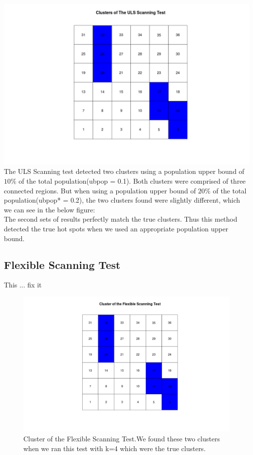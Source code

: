 \documentclass[12pt]{article}
\begin{document}
	 \includegraphics[scale=0.35]{Ex1_ULS} \\ The ULS Scanning test detected two clusters using a population upper bound of $10\%$ of the total population(ubpop = 0.1). Both clusters were comprised of three connected regions. But when using a population upper bound of $20\%$ of the total population(ubpop* = 0.2), the two clusters found were slightly different, which we can see in the below figure:\\
	 
	 
	 The second sets of results perfectly match the true clusters. Thus this method detected the true hot spots when we used an appropriate population upper bound.  \\ 
	
	 
	 
	 
\subsection{Flexible Scanning Test}	

This ... fix it
\begin{figure}[!ht]
	\centering
	\includegraphics[scale=0.2]{Ex1_Flexible}
	\caption{Cluster of the Flexible Scanning Test.We found these two clusters when we ran this test with k=4 which were the true clusters.\label{f:gull}}
\end{figure}
	
\end{document}
